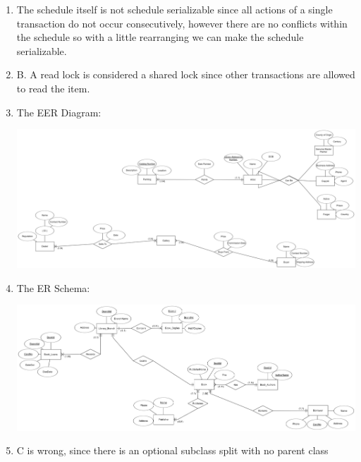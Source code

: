 \documentclass[12pt]{article}
\begin{document}
\begin{enumerate}
	\item  The schedule itself is not schedule serializable since all actions of a single transaction do not occur consecutively, however there are no conflicts within the
 schedule so with a little rearranging we can make the schedule serializable.

	\item B. A read lock is considered a shared lock since other transactions are allowed to read the item.
	\pagebreak
	\item The EER Diagram: \\
	\begin{center}
			\includegraphics[scale=.06]{40}
	\end{center} 
		
	\item The ER Schema: \\
	\begin{center}
			\includegraphics[scale=.07]{41}
	\end{center} 
	
	\item C is wrong, since there is an optional subclass split with no parent class
	
	\pagebreak	
	

\end{enumerate}
\end{document}
